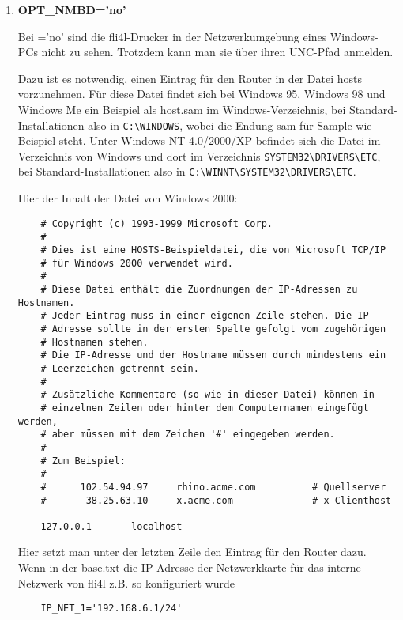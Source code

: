 \begin{enumerate}
\item \textbf{OPT\_NMBD='no'}

    Bei ='no' sind die fli4l-Drucker in der Netzwerkumgebung eines
    Windows-PCs nicht zu sehen. Trotzdem kann man sie über ihren UNC-Pfad
    anmelden.

    Dazu ist es notwendig, einen Eintrag für den Router in der Datei hosts
    vorzunehmen. Für diese Datei findet sich bei Windows 95, Windows 98 und
    Windows Me ein Beispiel als host.sam im Windows-Verzeichnis, bei
    Standard-Installationen also in \verb+C:\WINDOWS+, wobei die Endung sam für
    Sample wie Beispiel steht. Unter Windows NT 4.0/2000/XP befindet sich die
    Datei im Verzeichnis von Windows und dort im Verzeichnis
    \verb+SYSTEM32\DRIVERS\ETC+, bei Standard-Installationen also in
    \verb+C:\WINNT\SYSTEM32\DRIVERS\ETC+.

    Hier der Inhalt der Datei von Windows 2000:
\begin{example}
\begin{verbatim}
    # Copyright (c) 1993-1999 Microsoft Corp.
    #
    # Dies ist eine HOSTS-Beispieldatei, die von Microsoft TCP/IP
    # für Windows 2000 verwendet wird.
    #
    # Diese Datei enthält die Zuordnungen der IP-Adressen zu Hostnamen.
    # Jeder Eintrag muss in einer eigenen Zeile stehen. Die IP-
    # Adresse sollte in der ersten Spalte gefolgt vom zugehörigen
    # Hostnamen stehen.
    # Die IP-Adresse und der Hostname müssen durch mindestens ein
    # Leerzeichen getrennt sein.
    #
    # Zusätzliche Kommentare (so wie in dieser Datei) können in
    # einzelnen Zeilen oder hinter dem Computernamen eingefügt werden,
    # aber müssen mit dem Zeichen '#' eingegeben werden.
    #
    # Zum Beispiel:
    #
    #      102.54.94.97     rhino.acme.com          # Quellserver
    #       38.25.63.10     x.acme.com              # x-Clienthost

    127.0.0.1       localhost
\end{verbatim}
\end{example}


    Hier setzt man unter der letzten Zeile den Eintrag für den Router dazu.
    Wenn in der base.txt die IP-Adresse der Netzwerkkarte für das interne
    Netzwerk von fli4l z.B. so konfiguriert wurde

\begin{example}
\begin{verbatim}
    IP_NET_1='192.168.6.1/24'
\end{verbatim}
\end{example}


\end{enumerate}
